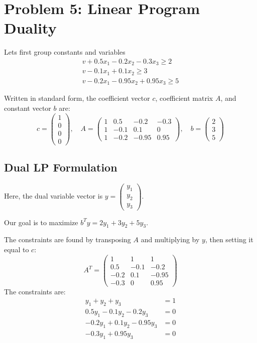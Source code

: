 \documentclass[11pt]{article}
\begin{document}
\section*{Problem 5: Linear Program Duality}

Lets first group constants and variables
\begin{align*}
		v + 0.5x_1 - 0.2x_2 - 0.3x_3 \ge 2 \\
		v - 0.1x_1 + 0.1x_2 \ge 3 \\
		v - 0.2x_1 - 0.95x_2 + 0.95x_3 \ge 5
\end{align*}

Written in standard form, the coefficient vector $c$, coefficient matrix $A$, and constant vector $b$ are:
$$
c =
\begin{pmatrix} 1 \\ 0 \\ 0 \\ 0
\end{pmatrix}, \quad
A =
\begin{pmatrix}
		1 & 0.5 & -0.2 & -0.3 \\
		1 & -0.1 & 0.1 & 0 \\
		1 & -0.2 & -0.95 & 0.95
\end{pmatrix}, \quad
b =
\begin{pmatrix} 2 \\ 3 \\ 5
\end{pmatrix}
$$

\subsection*{Dual LP Formulation}
Here, the dual variable vector is $y =
\begin{pmatrix} y_1 \\ y_2 \\ y_3
\end{pmatrix}$.

Our goal is to maximize $b^T y = 2y_1 + 3y_2 + 5y_3$.

The constraints are found by transposing $A$ and multiplying by $y$, then setting it equal to $c$:
$$
A^T =
\begin{pmatrix}
		1 & 1 & 1 \\
		0.5 & -0.1 & -0.2 \\
		-0.2 & 0.1 & -0.95 \\
		-0.3 & 0 & 0.95
\end{pmatrix}
$$
The constraints are:
\begin{align*}
		y_1 + y_2 + y_3 &= 1 \\
		0.5y_1 - 0.1y_2 - 0.2y_3 &= 0 \\
		-0.2y_1 + 0.1y_2 - 0.95y_3 &= 0 \\
		-0.3y_1 + 0.95y_3 &= 0
\end{align*}
\end{document}

